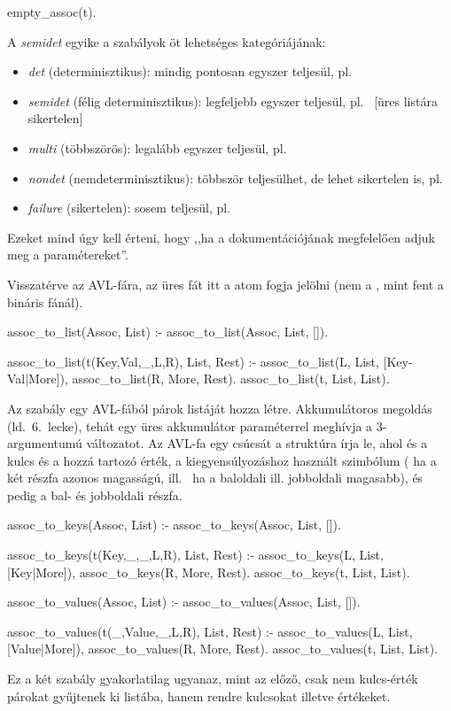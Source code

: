 \begin{program*}
empty_assoc(t).
\end{program*}
A \emph{semidet} egyike a szabályok öt lehetséges
kategóriájának:
\begin{itemize}
\item \emph{det} (determinisztikus): mindig pontosan
  egyszer teljesül, pl.~
\item \emph{semidet} (félig determinisztikus):
  legfeljebb egyszer teljesül, pl.~ [üres listára sikertelen]
\item \emph{multi} (többszörös): legalább egyszer
  teljesül, pl.~
\item \emph{nondet} (nemdeterminisztikus): többször
  teljesülhet, de lehet sikertelen is,
  pl.~
\item \emph{failure} (sikertelen): sosem teljesül,
  pl.~
\end{itemize}
Ezeket mind úgy kell érteni, hogy ,,ha a
dokumentációjának megfelelően adjuk meg a
paramétereket''.

Visszatérve az AVL-fára, az üres fát itt a 
atom fogja jelölni (nem a \pr{-}, mint fent a
bináris fánál).

\begin{program*}
assoc_to_list(Assoc, List) :-
    assoc_to_list(Assoc, List, []).

assoc_to_list(t(Key,Val,_,L,R), List, Rest) :-
    assoc_to_list(L, List, [Key-Val|More]),
    assoc_to_list(R, More, Rest).
assoc_to_list(t, List, List).
\end{program*}
Az  szabály egy AVL-fából párok
listáját hozza létre. Akkumulátoros megoldás
(ld.~6.~lecke), tehát egy üres akkumulátor
paraméterrel meghívja a 3-argumentumú változatot. Az
AVL-fa egy csúcsát a  struktúra
írja le, ahol  és  a kulcs és a hozzá
tartozó érték,  a kiegyensúlyozáshoz használt
szimbólum (\pr{-} ha a két részfa azonos magasságú,
\pr{<} ill.~\pr{>} ha a baloldali ill. jobboldali
magasabb),  és  pedig a bal- és
jobboldali részfa.

\begin{program*}
assoc_to_keys(Assoc, List) :-
    assoc_to_keys(Assoc, List, []).

assoc_to_keys(t(Key,_,_,L,R), List, Rest) :-
    assoc_to_keys(L, List, [Key|More]),
    assoc_to_keys(R, More, Rest).
assoc_to_keys(t, List, List).

assoc_to_values(Assoc, List) :-
    assoc_to_values(Assoc, List, []).

assoc_to_values(t(_,Value,_,L,R), List, Rest) :-
    assoc_to_values(L, List, [Value|More]),
    assoc_to_values(R, More, Rest).
assoc_to_values(t, List, List).
\end{program*}
Ez a két szabály gyakorlatilag ugyanaz, mint az
előző, csak nem kulcs-érték párokat gyűjtenek ki
listába, hanem rendre kulcsokat illetve értékeket.

